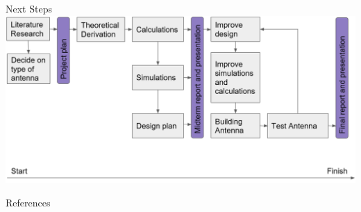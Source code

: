 \documentclass{beamer}
\begin{document}
\begin{frame}{Next Steps}
\includegraphics[width=\textwidth]{project_plan_block_diagram.png}
\end{frame}

\begin{frame}[allowframebreaks]{References}
\def\newblock{}


\end{frame}
\end{document}
